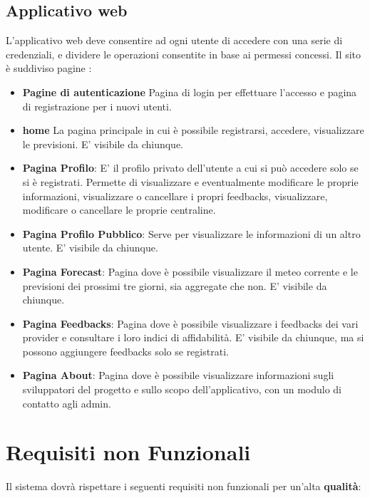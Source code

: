         \subsection{Applicativo web}
        L'applicativo web deve consentire ad ogni utente di accedere con una serie di credenziali, e dividere le operazioni consentite in base ai permessi concessi.
        Il sito è suddiviso pagine :
        \begin{itemize}
            \item \textbf{Pagine di autenticazione}
                Pagina di login per effettuare l'accesso e pagina di registrazione per i nuovi utenti.
            \item \textbf{home}
                La pagina principale in cui è possibile registrarsi, accedere, visualizzare le previsioni. E' visibile da chiunque.
            \item \textbf{Pagina Profilo}: E' il profilo privato dell'utente a cui si può accedere solo se si è registrati. Permette di visualizzare e eventualmente modificare le proprie informazioni, visualizzare o cancellare i propri feedbacks, visualizzare, modificare o cancellare le proprie centraline.
            \item \textbf{Pagina Profilo Pubblico}: Serve per visualizzare le informazioni di un altro utente. E' visibile da chiunque.
             \item \textbf{Pagina Forecast}: Pagina dove è possibile visualizzare il meteo corrente e le previsioni dei prossimi tre giorni, sia aggregate che non. E' visibile da chiunque.
              \item \textbf{Pagina Feedbacks}: Pagina dove è possibile visualizzare i feedbacks dei vari provider e consultare i loro indici di affidabilità. E' visibile da chiunque, ma si possono aggiungere feedbacks solo se registrati. 
              \item \textbf{Pagina About}: Pagina dove è possibile visualizzare informazioni sugli sviluppatori del progetto e sullo scopo dell'applicativo, con un modulo di contatto agli admin.
              
            
        \end{itemize}
        
    
        
	\section{Requisiti non Funzionali}	
    Il sistema dovrà rispettare i seguenti requisiti non funzionali per un'alta \textbf{qualità}:
 
